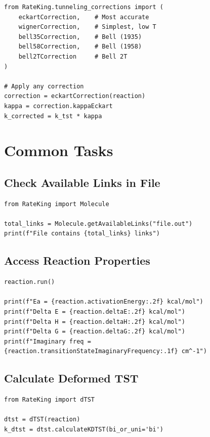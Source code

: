 \documentclass[11pt,a4paper]{article}
\begin{document}
\begin{lstlisting}
from RateKing.tunneling_corrections import (
    eckartCorrection,    # Most accurate
    wignerCorrection,    # Simplest, low T
    bell35Correction,    # Bell (1935)
    bell58Correction,    # Bell (1958)
    bell2TCorrection     # Bell 2T
)

# Apply any correction
correction = eckartCorrection(reaction)
kappa = correction.kappaEckart
k_corrected = k_tst * kappa
\end{lstlisting}

\section{Common Tasks}

\subsection{Check Available Links in File}

\begin{lstlisting}
from RateKing import Molecule

total_links = Molecule.getAvailableLinks("file.out")
print(f"File contains {total_links} links")
\end{lstlisting}

\subsection{Access Reaction Properties}

\begin{lstlisting}
reaction.run()

print(f"Ea = {reaction.activationEnergy:.2f} kcal/mol")
print(f"Delta E = {reaction.deltaE:.2f} kcal/mol")
print(f"Delta H = {reaction.deltaH:.2f} kcal/mol")
print(f"Delta G = {reaction.deltaG:.2f} kcal/mol")
print(f"Imaginary freq = {reaction.transitionStateImaginaryFrequency:.1f} cm^-1")
\end{lstlisting}

\subsection{Calculate Deformed TST}

\begin{lstlisting}
from RateKing import dTST

dtst = dTST(reaction)
k_dtst = dtst.calculateKDTST(bi_or_uni='bi')
\end{lstlisting}
\end{document}
